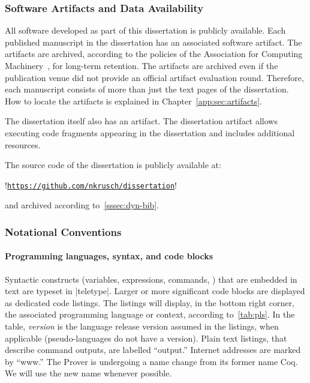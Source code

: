 \subsubsection{Software Artifacts and Data Availability}

All software developed as part of this dissertation is publicly available. Each
published manuscript in the dissertation has an associated software artifact.
The artifacts are archived, according to the policies of the Association for
Computing Machinery~\cite{acm_badging}, for long-term retention. The artifacts
are archived even if the publication venue did not provide an official artifact
evaluation round. Therefore, each manuscript consists of more than just the text
pages of the dissertation. How to locate the artifacts is explained
in Chapter~\autoref{app:sec:artifacts}.

The dissertation itself also has an artifact. The dissertation artifact allows
executing code fragments appearing in the dissertation and includes additional
resources.

The source code of the dissertation is publicly available at:

\begin{center}
\begin{minipage}{\textwidth}
\begin{browserlisting}[nolol,escapeinside=!!]
!\href{https://github.com/nkrusch/dissertation}
{\texttt{https://github.com/nkrusch/dissertation}}!
\end{browserlisting}
\end{minipage}
\end{center}

and archived according to~\autoref{sssec:dyn-bib}.

\subsubsection{Notational Conventions}

\paragraph*{Programming languages, syntax, and code blocks}
Syntactic constructs (variables, expressions, commands, \etc) that are embedded
in text are typeset in \pr|teletype|. Larger or more significant code blocks
are displayed as dedicated code listings. The listings will display, in the
bottom right corner, the associated programming language or context, according
to~\autoref{tab:pls}. In the table, \emph{version} is the language release
version assumed in the listings, when applicable (pseudo-languages do not have a
version). Plain text listings, that describe command outputs, are labelled
\enquote{output.} Internet addresses are marked by  \enquote{www.}
The  Prover is undergoing a name change from its former name
Coq. We will use the new name whenever possible.

